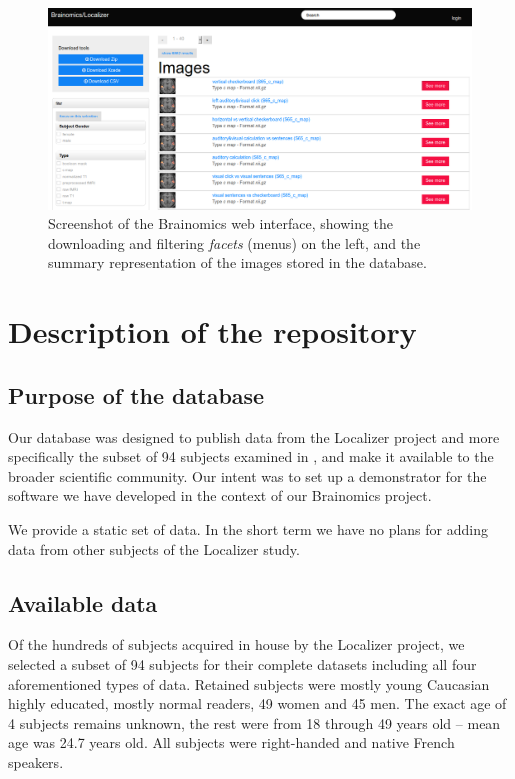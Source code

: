 \documentclass[preprint,review,12pt]{elsarticle}
\begin{document}
\begin{figure}[ht!]
    \includegraphics[width=\textwidth]{ui1}
    \caption{Screenshot of the Brainomics web interface, showing the downloading and filtering \emph{facets} (menus) on the left, and the summary representation of the images stored in the database.}
    \label{fig:ui}
\end{figure}


\section{Description of the repository}

\subsection{Purpose of the database}

Our database was designed to publish data from the Localizer project \cite{Pinel2007} and more specifically the subset of 94 subjects examined in \cite{Pinel2012}, and make it available to the broader scientific community. Our intent was to set up a demonstrator for the software we have developed in the context of our Brainomics project.

We provide a static set of data. In the short term we have no plans for adding data from other subjects of the Localizer study.


\subsection{Available data}

Of the hundreds of subjects acquired in house by the Localizer project, we selected a subset of 94 subjects for their complete datasets \cite{Pinel2012} including all four aforementioned types of data. Retained subjects were mostly young Caucasian highly educated, mostly normal readers, 49 women and 45 men. The exact age of 4 subjects remains unknown, the rest were from 18 through 49 years old -- mean age was 24.7 years old. All subjects were right-handed and native French speakers.
\end{document}
